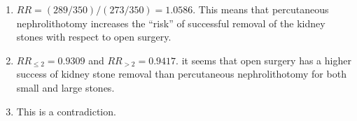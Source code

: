 \begin{enumerate}
    \item $RR = (289/350)/(273/350) = 1.0586$.  This means that percutaneous nephrolithotomy increases the “risk” of successful removal of the kidney stones with respect to open surgery.
    \hfill \cite{statistics/book/Statistics-for-Data-Scientists/Maurits-Kaptein}

    \item $RR_{\leq 2} = 0.9309$ and $RR_{>2} = 0.9417$. it seems that open surgery has a higher success of kidney stone removal than percutaneous nephrolithotomy for both small and large stones. 
    \hfill \cite{statistics/book/Statistics-for-Data-Scientists/Maurits-Kaptein}

    \item This is a contradiction.
    \hfill \cite{statistics/book/Statistics-for-Data-Scientists/Maurits-Kaptein}
\end{enumerate}











